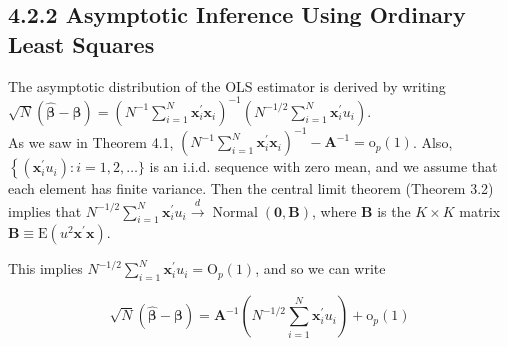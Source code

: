 \documentclass[10pt]{article}
\begin{document}
\subsection*{4.2.2 Asymptotic Inference Using Ordinary Least Squares}
The asymptotic distribution of the OLS estimator is derived by writing\\
$\sqrt{N}(\hat{\boldsymbol{\beta}}-\boldsymbol{\beta})=\left(N^{-1} \sum_{i=1}^{N} \mathbf{x}_{i}^{\prime} \mathbf{x}_{i}\right)^{-1}\left(N^{-1 / 2} \sum_{i=1}^{N} \mathbf{x}_{i}^{\prime} u_{i}\right)$.\\
As we saw in Theorem 4.1, $\left(N^{-1} \sum_{i=1}^{N} \mathbf{x}_{i}^{\prime} \mathbf{x}_{i}\right)^{-1}-\mathbf{A}^{-1}=\mathrm{o}_{p}(1)$. Also, $\left\{\left(\mathbf{x}_{i}^{\prime} u_{i}\right): i=\right. 1,2, \ldots\}$ is an i.i.d. sequence with zero mean, and we assume that each element has finite variance. Then the central limit theorem (Theorem 3.2) implies that $N^{-1 / 2} \sum_{i=1}^{N} \mathbf{x}_{i}^{\prime} u_{i} \xrightarrow{d} \operatorname{Normal}(\mathbf{0}, \mathbf{B})$, where $\mathbf{B}$ is the $K \times K$ matrix\\
$\mathbf{B} \equiv \mathrm{E}\left(u^{2} \mathbf{x}^{\prime} \mathbf{x}\right)$.

This implies $N^{-1 / 2} \sum_{i=1}^{N} \mathbf{x}_{i}^{\prime} u_{i}=\mathrm{O}_{p}(1)$, and so we can write


\begin{equation*}
\sqrt{N}(\hat{\boldsymbol{\beta}}-\boldsymbol{\beta})=\mathbf{A}^{-1}\left(N^{-1 / 2} \sum_{i=1}^{N} \mathbf{x}_{i}^{\prime} u_{i}\right)+\mathrm{o}_{p}(1) \tag{4.8}
\end{equation*}
\end{document}
